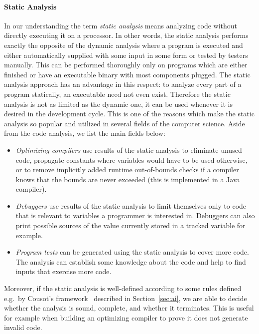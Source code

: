 \paragraph{Static Analysis} In our understanding the term \emph{static
analysis} means analyzing code without directly executing it on a processor.
In other words, the static analysis performs exactly the opposite of the
dynamic analysis where a program is executed and either automatically supplied
with some input in some form or tested by testers manually.  This can be
performed thoroughly only on programs which are either finished or have an
executable binary with most components plugged.  The static analysis approach
has an advantage in this respect: to analyze every part of a program
statically, an executable need not even exist.  Therefore the static analysis
is not as limited as the dynamic one, it can be used whenever it is desired in
the development cycle. This is one of the reasons which make the static
analysis so popular and utilized in several fields of the computer science.
Aside from the code analysis, we list the main fields below:
\begin{itemize}
\item \emph{Optimizing compilers} use results of the static analysis to
eliminate unused code, propagate constants where variables would have to be
used otherwise, or to remove implicitly added runtime out-of-bounds checks if
a compiler knows that the bounds are never exceeded (this is implemented in a
Java compiler).

\item \emph{Debuggers} use results of the static analysis to limit themselves
only to code that is relevant to variables a programmer is interested in.
Debuggers can also print possible sources of the value currently stored in a
tracked variable for example.

\item \emph{Program tests} can be generated using the static analysis to cover
more code. The analysis can establish some knowledge about the code and help
to find inputs that exercise more code.

\end{itemize}

Moreover, if the static analysis is well-defined according to some rules
defined e.g.\ by Cousot's framework~\cite{cousot} described in
Section~\ref{sec:ai}, we are able to decide whether the analysis is sound,
complete, and whether it terminates.  This is useful for example when building
an optimizing compiler to prove it does not generate invalid code.

